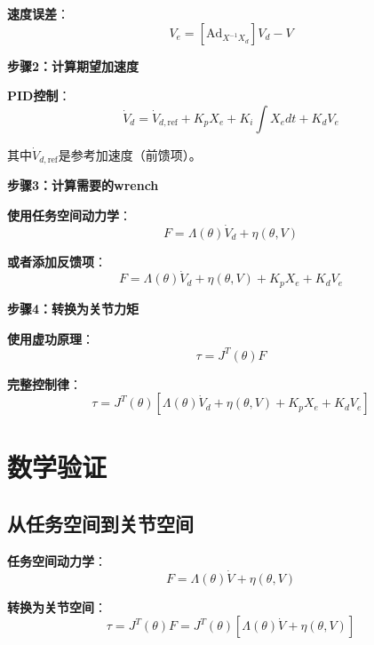 \documentclass[12pt,a4paper]{article}
\begin{document}
\textbf{速度误差}：
\begin{equation}
V_e = [\text{Ad}_{X^{-1}X_d}]V_d - V
\end{equation}

\textbf{步骤2：计算期望加速度}

\textbf{PID控制}：
\begin{equation}
\dot{V}_d = \dot{V}_{d,\text{ref}} + K_p X_e + K_i \int X_e dt + K_d V_e
\end{equation}

其中$\dot{V}_{d,\text{ref}}$是参考加速度（前馈项）。

\textbf{步骤3：计算需要的wrench}

\textbf{使用任务空间动力学}：
\begin{equation}
F = \Lambda(\theta)\dot{V}_d + \eta(\theta, V) \tag{8.89}
\end{equation}

\textbf{或者添加反馈项}：
\begin{equation}
F = \Lambda(\theta)\dot{V}_d + \eta(\theta, V) + K_p X_e + K_d V_e
\end{equation}

\textbf{步骤4：转换为关节力矩}

\textbf{使用虚功原理}：
\begin{equation}
\tau = J^T(\theta)F \tag{8.51}
\end{equation}

\textbf{完整控制律}：
\begin{equation}
\tau = J^T(\theta)\left[\Lambda(\theta)\dot{V}_d + \eta(\theta, V) + K_p X_e + K_d V_e\right] \tag{11.47}
\end{equation}

\section{数学验证}

\subsection{从任务空间到关节空间}

\textbf{任务空间动力学}：
\begin{equation}
F = \Lambda(\theta)\dot{V} + \eta(\theta, V) \tag{8.89}
\end{equation}

\textbf{转换为关节空间}：
\begin{equation}
\tau = J^T(\theta)F = J^T(\theta)\left[\Lambda(\theta)\dot{V} + \eta(\theta, V)\right]
\end{equation}
\end{document}
